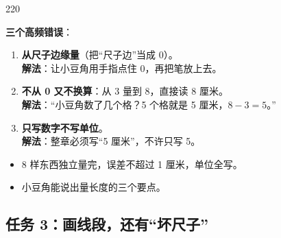 \begin{lesson}{2}{20}
\begin{pitbox}
\textbf{三个高频错误}：
\begin{enumerate}[label=\arabic*、]
  \item \textbf{从尺子边缘量}（把“尺子边”当成 0）。\\
\textbf{解法}：让小豆角用手指点住 0，再把笔放上去。
  \item \textbf{不从 0 又不换算}：从 3 量到 8，直接读 8 厘米。\\
\textbf{解法}：“小豆角数了几个格？5 个格就是 5 厘米，$8-3=5$。”
  \item \textbf{只写数字不写单位}。\\
\textbf{解法}：整章必须写“5 厘米”，不许只写 5。
\end{enumerate}
\end{pitbox}

\begin{passbox}
\begin{itemize}
  \item 8 样东西独立量完，误差不超过 1 厘米，单位全写。
  \item 小豆角能说出量长度的三个要点。
\end{itemize}
\end{passbox}
\end{lesson}

\subsection{任务 3：画线段，还有“坏尺子”}

